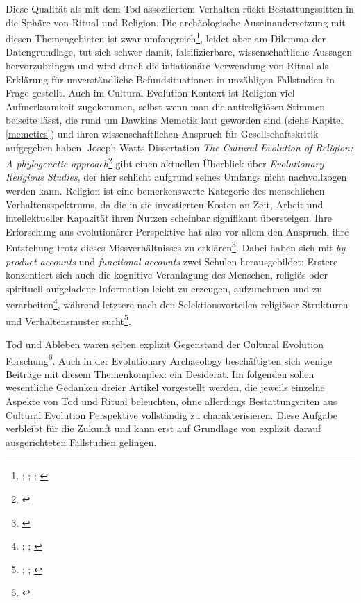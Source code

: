 \documentclass[openany,twoside,twocolumn]{book}
\let\rmarkdownfootnote\footnote%
\def\footnote{\protect\rmarkdownfootnote}
\begin{document}
Diese Qualität als mit dem Tod assoziiertem Verhalten rückt
Bestattungssitten in die Sphäre von Ritual und Religion. Die
archäologische Auseinandersetzung mit diesen Themengebieten ist zwar
umfangreich\footnote{\textcite{bertemes_archaeology_2001};
  \textcite{chapman_archaeology_1981};
  \textcite{insoll_archaeology_2004};
  \textcite{renfrew_archaeology_1994}}, leidet aber am Dilemma der
Datengrundlage, tut sich schwer damit, falsifizierbare,
wissenschaftliche Aussagen hervorzubringen und wird durch die
inflationäre Verwendung von Ritual als Erklärung für unverständliche
Befundsituationen in unzähligen Fallstudien in Frage gestellt. Auch im
Cultural Evolution Kontext ist Religion viel Aufmerksamkeit zugekommen,
selbst wenn man die antireligiösen Stimmen beiseite lässt, die rund um
Dawkins Memetik laut geworden sind (siehe Kapitel \ref{memetics}) und
ihren wissenschaftlichen Anspruch für Gesellschaftskritik aufgegeben
haben. Joseph Watts Dissertation \emph{The Cultural Evolution of
Religion: A phylogenetic approach}\footnote{\textcite{watts_cultural_2016}}
gibt einen aktuellen Überblick über \emph{Evolutionary Religious
Studies}, der hier schlicht aufgrund seines Umfangs nicht nachvollzogen
werden kann. Religion ist eine bemerkenswerte Kategorie des menschlichen
Verhaltensspektrums, da die in sie investierten Kosten an Zeit, Arbeit
und intellektueller Kapazität ihren Nutzen scheinbar signifikant
übersteigen. Ihre Erforschung aus evolutionärer Perspektive hat also vor
allem den Anspruch, ihre Entstehung trotz dieses Missverhältnisses zu
erklären\footnote{\textcite{wilson_evolutionary_2012-1}}. Dabei haben
sich mit \emph{by-product accounts} und \emph{functional accounts} zwei
Schulen herausgebildet: Erstere konzentiert sich auch die kognitive
Veranlagung des Menschen, religiös oder spirituell aufgeladene
Information leicht zu erzeugen, aufzunehmen und zu verarbeiten\footnote{\textcite{barrett_exploring_2000};
  \textcite{baumard_explaining_2013}; \textcite{boyer_evolutionary_2008}},
während letztere nach den Selektionsvorteilen religiöser Strukturen und
Verhaltensmuster sucht\footnote{\textcite{norenzayan_cultural_2016};
  \textcite{sosis_adaptationist-byproduct_2009};
  \textcite{wilson_darwins_2002}}.

Tod und Ableben waren selten explizit Gegenstand der Cultural Evolution
Forschung\footnote{\textcite{falger_cultural_2003}}. Auch in der
Evolutionary Archaeology beschäftigten sich wenige Beiträge mit diesem
Themenkomplex: ein Desiderat. Im folgenden sollen wesentliche Gedanken
dreier Artikel vorgestellt werden, die jeweils einzelne Aspekte von Tod
und Ritual beleuchten, ohne allerdings Bestattungsriten aus Cultural
Evolution Perspektive vollständig zu charakterisieren. Diese Aufgabe
verbleibt für die Zukunft und kann erst auf Grundlage von explizit
darauf ausgerichteten Fallstudien gelingen.
\end{document}
